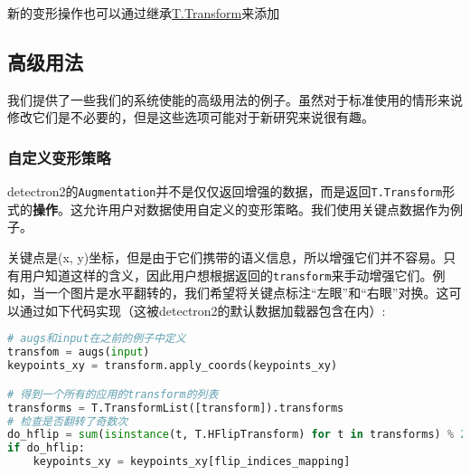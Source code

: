 \documentclass[../main]{subfile}
\begin{document}
新的变形操作也可以通过继承\href{https://detectron2.readthedocs.io/en/latest/modules/data_transforms.html#detectron2.data.transforms.Transform}{T.Transform}来添加

\subsection{高级用法}

我们提供了一些我们的系统使能的高级用法的例子。虽然对于标准使用的情形来说修改它们是不必要的，但是这些选项可能对于新研究来说很有趣。

\subsubsection{自定义变形策略}

detectron2的\lstinline{Augmentation}并不是仅仅返回增强的数据，而是返回\lstinline{T.Transform}形式的\textbf{操作}。这允许用户对数据使用自定义的变形策略。我们使用关键点数据作为例子。

关键点是(x, y)坐标，但是由于它们携带的语义信息，所以增强它们并不容易。只有用户知道这样的含义，因此用户想根据返回的\lstinline{transform}来手动增强它们。例如，当一个图片是水平翻转的，我们希望将关键点标注“左眼”和“右眼”对换。这可以通过如下代码实现（这被detectron2的默认数据加载器包含在内）:

\begin{lstlisting}[language=Python]
# augs和input在之前的例子中定义
transfom = augs(input)
keypoints_xy = transform.apply_coords(keypoints_xy)

# 得到一个所有的应用的transform的列表
transforms = T.TransformList([transform]).transforms
# 检查是否翻转了奇数次
do_hflip = sum(isinstance(t, T.HFlipTransform) for t in transforms) % 2 == 1
if do_hflip:
    keypoints_xy = keypoints_xy[flip_indices_mapping]
\end{lstlisting}
\end{document}
